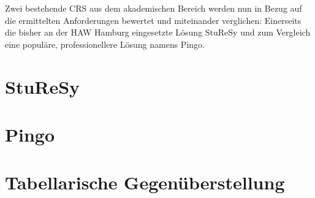 Zwei bestehende CRS aus dem akademischen Bereich werden nun in Bezug auf die ermittelten Anforderungen bewertet und miteinander verglichen: Einerseits die bisher an der HAW Hamburg eingesetzte Lösung StuReSy und zum Vergleich eine populäre, professionellere Lösung namens Pingo.

\section{StuReSy}
\label{chap:sturesy}


\newpage
\section{Pingo}
\label{chap:pingo}


\newpage
\section{Tabellarische Gegenüberstellung}
\label{chap:tabelle}
